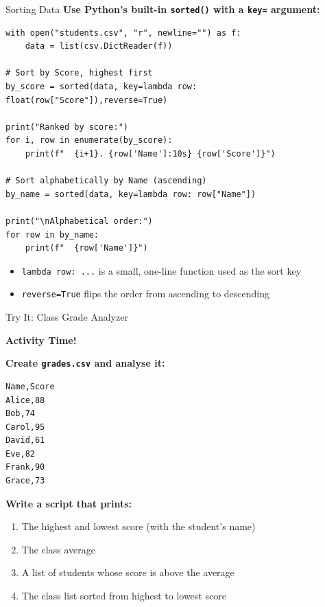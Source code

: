 \documentclass{csbeamer}
\begin{document}
\begin{frame}[fragile]{Sorting Data}
    \textbf{Use Python's built-in \texttt{sorted()} with a \textcolor{stfxblue}{\texttt{key=}} argument:}

    \begin{lstlisting}
with open("students.csv", "r", newline="") as f:
    data = list(csv.DictReader(f))

# Sort by Score, highest first
by_score = sorted(data, key=lambda row: float(row["Score"]),reverse=True)

print("Ranked by score:")
for i, row in enumerate(by_score):
    print(f"  {i+1}. {row['Name']:10s} {row['Score']}")

# Sort alphabetically by Name (ascending)
by_name = sorted(data, key=lambda row: row["Name"])

print("\nAlphabetical order:")
for row in by_name:
    print(f"  {row['Name']}")
    \end{lstlisting}

    \pause

    \begin{itemize}
        \item \texttt{lambda row: ...} is a small, one-line function used as the sort key
        \item \texttt{reverse=True} flips the order from ascending to descending
    \end{itemize}
\end{frame}

\begin{frame}[fragile]{Try It: Class Grade Analyzer}
    \begin{center}
        \Large \textbf{Activity Time!}
    \end{center}

    \vspace{0.5em}

    \textbf{Create \texttt{grades.csv} and analyse it:}
    \begin{lstlisting}[language={},frame=single,numbers=none]
Name,Score
Alice,88
Bob,74
Carol,95
David,61
Eve,82
Frank,90
Grace,73
    \end{lstlisting}

    \textbf{Write a script that prints:}
    \begin{enumerate}
        \item The \textcolor{stfxblue}{highest} and \textcolor{stfxblue}{lowest} score (with the student's name)
        \item The \textcolor{marigold}{class average}
        \item A list of students whose score is \textcolor{stfxblue}{above the average}
        \item The class list sorted from \textcolor{marigold}{highest to lowest} score
    \end{enumerate}
\end{frame}
\end{document}
